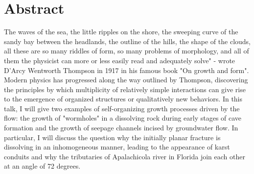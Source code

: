 	\section*{Abstract}
	
	The waves of the sea, the little ripples on the shore, the sweeping curve of the sandy bay between the headlands, the outline of the hills, the shape of the clouds, all these are so many riddles of form, so many problems of morphology, and all of them the physicist can more or less easily read and adequately solve" - wrote D'Arcy Wentworth Thompson in 1917 in his famous book "On growth and form". Modern physics has progressed along the way outlined by Thompson, discovering the principles by which multiplicity of relatively simple interactions can give rise to the emergence of organized structures or qualitatively new behaviors. In this talk, I will give two examples of self-organizing growth processes driven by the flow: the growth of "wormholes" in a dissolving rock during early stages of cave formation and the growth of seepage channels incised by groundwater flow. In particular, I will discuss the question why the initially planar fracture is dissolving in an inhomogeneous manner, leading to the appearance of karst conduits and why the tributaries of Apalachicola river in Florida join each other at an angle of 72 degrees.
    \vspace{.5cm}
    \newpage
    
